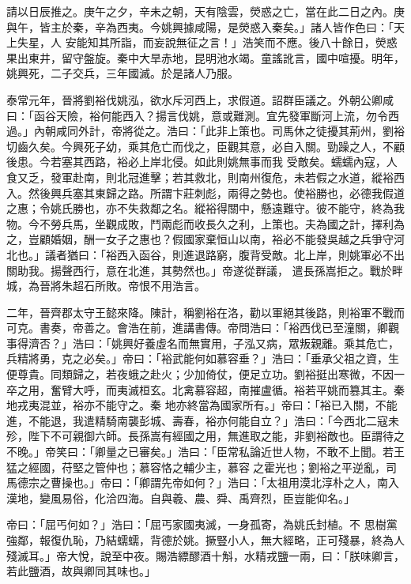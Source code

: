 \begin{pinyinscope}
 請以日辰推之。庚午之夕，辛未之朝，天有陰雲，熒惑之亡，當在此二日之內。庚與午，皆主於秦，辛為西夷。今姚興據咸陽，是熒惑入秦矣。」諸人皆作色曰：「天上失星，人
 安能知其所詣，而妄說無征之言！」浩笑而不應。後八十餘日，熒惑果出東井，留守盤旋。秦中大旱赤地，昆明池水竭。童謠訛言，國中喧擾。明年，姚興死，二子交兵，三年國滅。於是諸人乃服。



 泰常元年，晉將劉裕伐姚泓，欲水斥河西上，求假道。詔群臣議之。外朝公卿咸曰：「函谷天險，裕何能西入？揚言伐姚，意或難測。宜先發軍斷河上流，勿令西過。」內朝咸同外計，帝將從之。浩曰：「此非上策也。司馬休之徒擾其荊州，劉裕切齒久矣。今興死子幼，乘其危亡而伐之，臣觀其意，必自入關。勁躁之人，不顧後患。今若塞其西路，裕必上岸北侵。如此則姚無事而我
 受敵矣。蠕蠕內寇，人食又乏，發軍赴南，則北冠進擊；若其救北，則南州復危，未若假之水道，縱裕西入。然後興兵塞其東歸之路。所謂卞莊刺彪，兩得之勢也。使裕勝也，必德我假道之惠；令姚氏勝也，亦不失救鄰之名。縱裕得關中，懸遠難守。彼不能守，終為我物。今不勞兵馬，坐觀成敗，鬥兩彪而收長久之利，上策也。夫為國之計，擇利為之，豈顧婚姻，酬一女子之惠也？假國家棄恒山以南，裕必不能發吳越之兵爭守河北也。」議者猶曰：「裕西入函谷，則進退路窮，腹背受敵。北上岸，則姚軍必不出關助我。揚聲西行，意在北進，其勢然也。」帝遂從群議，
 遣長孫嵩拒之。戰於畔城，為晉將朱超石所敗。帝恨不用浩言。



 二年，晉齊郡太守王懿來降。陳計，稱劉裕在洛，勸以軍絕其後路，則裕軍不戰而可克。書奏，帝善之。會浩在前，進講書傳。帝問浩曰：「裕西伐已至潼關，卿觀事得濟否？」浩曰：「姚興好養虛名而無實用，子泓又病，眾叛親離。乘其危亡，兵精將勇，克之必矣。」帝曰：「裕武能何如慕容垂？」浩曰：「垂承父祖之資，生便尊貴。同類歸之，若夜蛾之赴火；少加倚仗，便足立功。劉裕挺出寒微，不因一卒之用，奮臂大呼，而夷滅桓玄。北禽慕容超，南摧盧循。裕若平姚而篡其主。秦地戎夷混並，裕亦不能守之。秦
 地亦終當為國家所有。」帝曰：「裕已入關，不能進，不能退，我遣精騎南襲彭城、壽春，裕亦何能自立？」浩曰：「今西北二寇未殄，陛下不可親御六師。長孫嵩有經國之用，無進取之能，非劉裕敵也。臣謂待之不晚。」帝笑曰：「卿量之已審矣。」浩曰：「臣常私論近世人物，不敢不上聞。若王猛之經國，苻堅之管仲也；慕容恪之輔少主，慕容之霍光也；劉裕之平逆亂，司馬德宗之曹操也。」帝曰：「卿謂先帝如何？」浩曰：「太祖用漠北淳朴之人，南入漢地，變風易俗，化洽四海。自與羲、農、舜、禹齊烈，臣豈能仰名。」



 帝曰：「屈丐何如？」浩曰：「屈丐家國夷滅，一身孤寄，為姚氏封植。不
 思樹黨強鄰，報復仇恥，乃結蠕蠕，背德於姚。撅豎小人，無大經略，正可殘暴，終為人殘滅耳。」帝大悅，說至中夜。賜浩縹醪酒十斛，水精戎鹽一兩，曰：「朕味卿言，若此鹽酒，故與卿同其味也。」




\end{pinyinscope}

